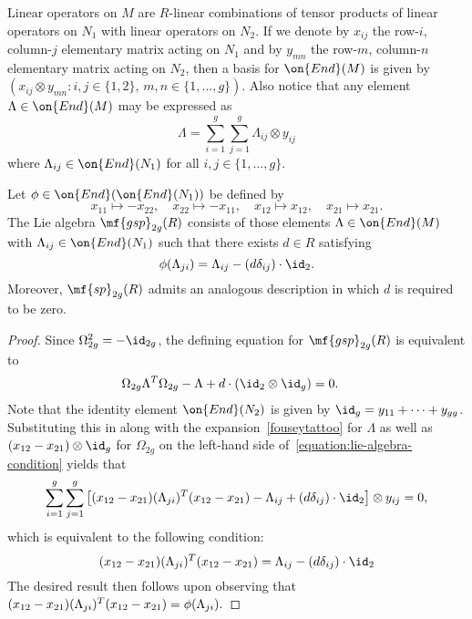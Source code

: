 Linear operators on $M$ are $R$-linear combinations of tensor products of linear operators on $N_1$ with linear operators on $N_2$. If we denote by $x_{ij}$ the row-$i$, column-$j$ elementary matrix acting on $N_1$ and by $y_{mn}$ the row-$m$, column-$n$ elementary matrix acting on $N_2$, then a basis for $\on{End}(M)$ is given by $(x_{ij} \otimes y_{mn} : i,j \in \{1, 2\},\, m,n \in \{1, \dots, g\})$. Also notice that any element $\Lambda \in \on{End}(M)$ may be expressed as
\begin{equation}\label{fouseytattoo}
\Lambda =  \sum_{i=1}^g \sum_{j=1}^g \Lambda_{ij} \otimes y_{ij}
\end{equation}
where $\Lambda_{ij} \in \on{End}(N_1)$ for all $i,j \in \{1,\dots, g\}$.
\begin{proposition} \label{proposition:lie}
	Let $\phi \in \on{End}(\on{End}(N_1))$ be defined by
	\[
	x_{11} \mapsto -x_{22}, \quad x_{22} \mapsto -x_{11}, \quad x_{12} \mapsto x_{12}, \quad x_{21} \mapsto x_{21}.
	\]
The Lie algebra $\mf{gsp}_{2g}(R)$ consists of those elements $\Lambda \in \on{End}(M)$ with $\Lambda_{ij} \in \on{End}(N_1)$ such that there exists $d \in R$ satisfying
    $$\phi(\Lambda_{ji}) = \Lambda_{ij} - (d\delta_{ij}) \cdot \id_2.$$
Moreover, $\mf{sp}_{2g}(R)$ admits an analogous description in which $d$ is required to be zero. %
\end{proposition}
\begin{proof}  
Since $\Omega_{2g}^2 = -\id_{2g}$, the defining equation for $\mf{gsp}_{2g}(R)$ is equivalent to
\begin{align}	
\Omega_{2g} \Lambda^T \Omega_{2g} - \Lambda + d \cdot (\id_2 \otimes \id_g) & = 0. \label{equation:lie-algebra-condition}
\end{align} %
Note that the identity element $\on{End}(N_2)$ is given by $\id_g = y_{11} + \cdots + y_{gg}$. Substituting this in along with the expansion~\eqref{fouseytattoo} for $\Lambda$ as well as $(x_{12} - x_{21}) \otimes \id_g$ for $\Omega_{2g}$ on the left-hand side of~\eqref{equation:lie-algebra-condition} yields that
\[
\sum_{i =1}^g \sum_{j=1}^g \big[ (x_{12} - x_{21})(\Lambda_{ji})^T(x_{12} - x_{21}) - \Lambda_{ij} + (d\delta_{ij}) \cdot \id_2 \big] \otimes y_{ij} = 0,
\]
which is equivalent to the following condition:
\[
(x_{12} - x_{21})(\Lambda_{ji})^T(x_{12} - x_{21}) = \Lambda_{ij} - (d\delta_{ij}) \cdot \id_2
\]%
The desired result then follows upon observing that 
	\(
	(x_{12} - x_{21})(\Lambda_{ji})^T(x_{12} - x_{21}) = \phi(\Lambda_{ji}). \qedhere
	\)
\end{proof} 

